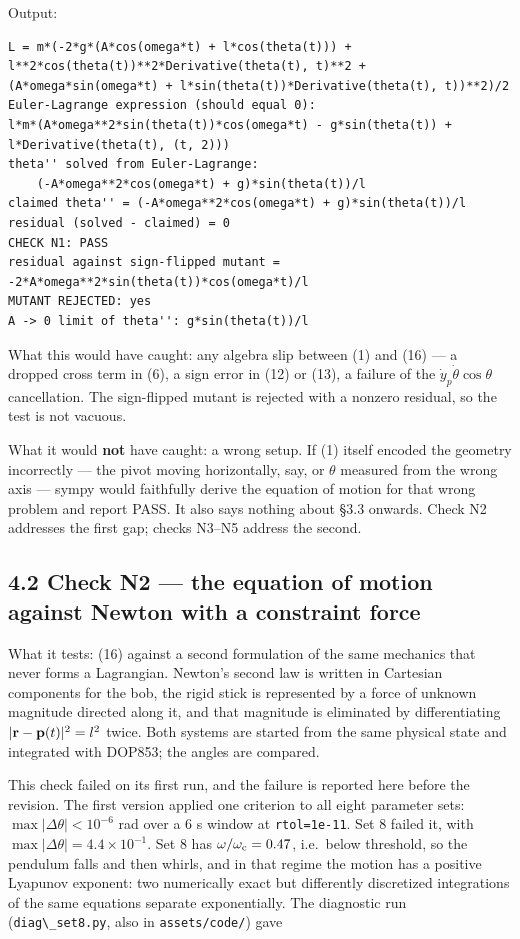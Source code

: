 \documentclass[11pt,a4paper]{article}
\newcommand{\tagmark}[1]{\marginnote{\scriptsize\ttfamily #1}}
\newcommand{\Ntag}{\tagmark{[N]}}   %
\providecommand{\passthrough}[1]{#1}
\begin{document}
Output:

\begin{lstlisting}
L = m*(-2*g*(A*cos(omega*t) + l*cos(theta(t))) + l**2*cos(theta(t))**2*Derivative(theta(t), t)**2 + (A*omega*sin(omega*t) + l*sin(theta(t))*Derivative(theta(t), t))**2)/2
Euler-Lagrange expression (should equal 0):
l*m*(A*omega**2*sin(theta(t))*cos(omega*t) - g*sin(theta(t)) + l*Derivative(theta(t), (t, 2)))
theta'' solved from Euler-Lagrange:
    (-A*omega**2*cos(omega*t) + g)*sin(theta(t))/l
claimed theta'' = (-A*omega**2*cos(omega*t) + g)*sin(theta(t))/l
residual (solved - claimed) = 0
CHECK N1: PASS
residual against sign-flipped mutant = -2*A*omega**2*sin(theta(t))*cos(omega*t)/l
MUTANT REJECTED: yes
A -> 0 limit of theta'': g*sin(theta(t))/l
\end{lstlisting}

What this would have caught: any algebra slip between (1) and (16) --- a dropped
cross term in (6), a sign error in (12) or (13), a failure of the
\(\dot y_p\dot\theta\cos\theta\) cancellation. The sign-flipped mutant is rejected
with a nonzero residual, so the test is not vacuous.

What it would \textbf{not} have caught: a wrong setup. If (1) itself encoded the
geometry incorrectly --- the pivot moving horizontally, say, or \(\theta\) measured
from the wrong axis --- sympy would faithfully derive the equation of motion for
that wrong problem and report PASS. It also says nothing about §3.3 onwards.
Check N2 addresses the first gap; checks N3--N5 address the second.

\hypertarget{check-n2-the-equation-of-motion-against-newton-with-a-constraint-force}{%
\subsection{4.2 Check N2 --- the equation of motion against Newton with a constraint force}\label{check-n2-the-equation-of-motion-against-newton-with-a-constraint-force}}

\Ntag{} What it tests: (16) against a second formulation of the same mechanics
that never forms a Lagrangian. Newton's second law is written in Cartesian
components for the bob, the rigid stick is represented by a force of unknown
magnitude directed along it, and that magnitude is eliminated by differentiating
\(|{\bf r}-{\bf p}(t)|^2=l^2\) twice. Both systems are started from the same
physical state and integrated with DOP853; the angles are compared.

This check failed on its first run, and the failure is reported here before
the revision. The first version applied one criterion to all eight parameter
sets: \(\max|\Delta\theta|<10^{-6}\) rad over a 6 s window at \passthrough{\lstinline!rtol=1e-11!}. Set 8
failed it, with \(\max|\Delta\theta|=4.4\times10^{-1}\). Set 8 has
\(\omega/\omega_{\rm c}=0.47\), i.e.~below threshold, so the pendulum falls and
then whirls, and in that regime the motion has a positive Lyapunov exponent: two
numerically exact but differently discretized integrations of the same equations
separate exponentially. The diagnostic run (\passthrough{\lstinline!diag\_set8.py!}, also in
\passthrough{\lstinline!assets/code/!}) gave
\end{document}
